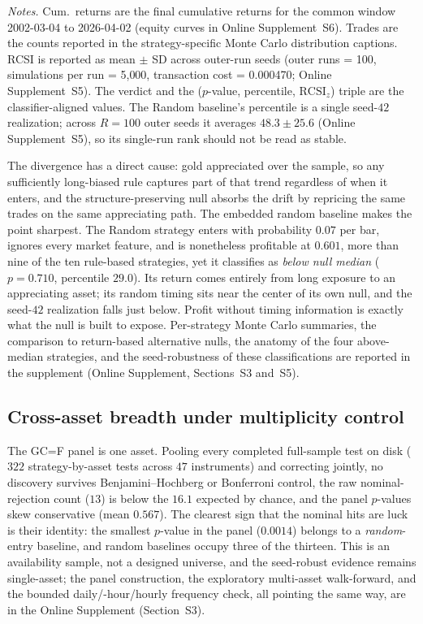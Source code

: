 \documentclass[preprint,12pt]{elsarticle}
\theoremstyle{definition}
\begin{document}
\begin{table}[t]
\begin{minipage}{0.95\textwidth}
\centering
\footnotesize\emph{Notes.} Cum.\ returns are the final cumulative returns for the common window 2002-03-04 to 2026-04-02 (equity curves in Online Supplement~S6). Trades are the counts reported in the strategy-specific Monte Carlo distribution captions. RCSI is reported as mean $\pm$ SD across outer-run seeds (outer runs = 100, simulations per run = 5{,}000, transaction cost = 0.000470; Online Supplement~S5). The verdict and the ($p$-value, percentile, $\mathrm{RCSI}_z$) triple are the classifier-aligned values. The Random baseline's percentile is a single seed-$42$ realization; across $R=100$ outer seeds it averages $48.3\pm25.6$ (Online Supplement~S5), so its single-run rank should not be read as stable.
\end{minipage}
\end{table}

The divergence has a direct cause: gold appreciated over the sample, so any sufficiently long-biased rule captures part of that trend regardless of when it enters, and the structure-preserving null absorbs the drift by repricing the same trades on the same appreciating path. The embedded random baseline makes the point sharpest. The Random strategy enters with probability $0.07$ per bar, ignores every market feature, and is nonetheless profitable at $0.601$, more than nine of the ten rule-based strategies, yet it classifies as \emph{below null median} ($p=0.710$, percentile $29.0$). Its return comes entirely from long exposure to an appreciating asset; its random timing sits near the center of its own null, and the seed-$42$ realization falls just below. Profit without timing information is exactly what the null is built to expose. Per-strategy Monte Carlo summaries, the comparison to return-based alternative nulls, the anatomy of the four above-median strategies, and the seed-robustness of these classifications are reported in the supplement (Online Supplement, Sections~S3 and~S5).

\subsection{Cross-asset breadth under multiplicity control}
\label{sec:cross-asset-multiplicity}

The GC=F panel is one asset. Pooling every completed full-sample test on disk ($322$ strategy-by-asset tests across $47$ instruments) and correcting jointly, no discovery survives Benjamini--Hochberg or Bonferroni control, the raw nominal-rejection count ($13$) is below the $16.1$ expected by chance, and the panel $p$-values skew conservative (mean $0.567$). The clearest sign that the nominal hits are luck is their identity: the smallest $p$-value in the panel ($0.0014$) belongs to a \emph{random}-entry baseline, and random baselines occupy three of the thirteen. This is an availability sample, not a designed universe, and the seed-robust evidence remains single-asset; the panel construction, the exploratory multi-asset walk-forward, and the bounded daily/-hour/\allowbreak hourly frequency check, all pointing the same way, are in the Online Supplement (Section~S3).
\end{document}
